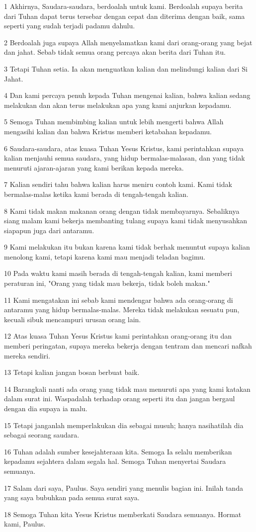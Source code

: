 \par 1 Akhirnya, Saudara-saudara, berdoalah untuk kami. Berdoalah supaya berita dari Tuhan dapat terus tersebar dengan cepat dan diterima dengan baik, sama seperti yang sudah terjadi padamu dahulu.
\par 2 Berdoalah juga supaya Allah menyelamatkan kami dari orang-orang yang bejat dan jahat. Sebab tidak semua orang percaya akan berita dari Tuhan itu.
\par 3 Tetapi Tuhan setia. Ia akan menguatkan kalian dan melindungi kalian dari Si Jahat.
\par 4 Dan kami percaya penuh kepada Tuhan mengenai kalian, bahwa kalian sedang melakukan dan akan terus melakukan apa yang kami anjurkan kepadamu.
\par 5 Semoga Tuhan membimbing kalian untuk lebih mengerti bahwa Allah mengasihi kalian dan bahwa Kristus memberi ketabahan kepadamu.
\par 6 Saudara-saudara, atas kuasa Tuhan Yesus Kristus, kami perintahkan supaya kalian menjauhi semua saudara, yang hidup bermalas-malasan, dan yang tidak menuruti ajaran-ajaran yang kami berikan kepada mereka.
\par 7 Kalian sendiri tahu bahwa kalian harus meniru contoh kami. Kami tidak bermalas-malas ketika kami berada di tengah-tengah kalian.
\par 8 Kami tidak makan makanan orang dengan tidak membayarnya. Sebaliknya siang malam kami bekerja membanting tulang supaya kami tidak menyusahkan siapapun juga dari antaramu.
\par 9 Kami melakukan itu bukan karena kami tidak berhak menuntut supaya kalian menolong kami, tetapi karena kami mau menjadi teladan bagimu.
\par 10 Pada waktu kami masih berada di tengah-tengah kalian, kami memberi peraturan ini, "Orang yang tidak mau bekerja, tidak boleh makan."
\par 11 Kami mengatakan ini sebab kami mendengar bahwa ada orang-orang di antaramu yang hidup bermalas-malas. Mereka tidak melakukan sesuatu pun, kecuali sibuk mencampuri urusan orang lain.
\par 12 Atas kuasa Tuhan Yesus Kristus kami perintahkan orang-orang itu dan memberi peringatan, supaya mereka bekerja dengan tentram dan mencari nafkah mereka sendiri.
\par 13 Tetapi kalian jangan bosan berbuat baik.
\par 14 Barangkali nanti ada orang yang tidak mau menuruti apa yang kami katakan dalam surat ini. Waspadalah terhadap orang seperti itu dan jangan bergaul dengan dia supaya ia malu.
\par 15 Tetapi janganlah memperlakukan dia sebagai musuh; hanya nasihatilah dia sebagai seorang saudara.
\par 16 Tuhan adalah sumber kesejahteraan kita. Semoga Ia selalu memberikan kepadamu sejahtera dalam segala hal. Semoga Tuhan menyertai Saudara semuanya.
\par 17 Salam dari saya, Paulus. Saya sendiri yang menulis bagian ini. Inilah tanda yang saya bubuhkan pada semua surat saya.
\par 18 Semoga Tuhan kita Yesus Kristus memberkati Saudara semuanya. Hormat kami, Paulus.


